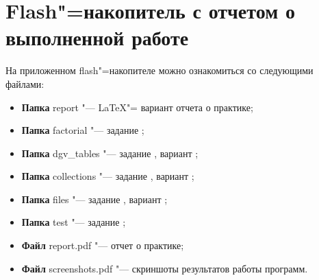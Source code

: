\section{Flash"=накопитель с отчетом о выполненной работе} \label{app:repo}
На приложенном flash"=накопителе можно ознакомиться со следующими файлами:
\begin{itemize}
    \item[] \textbf{Папка} report "--- \LaTeX "= вариант отчета о практике;
    \item[] \textbf{Папка} factorial "--- задание ;
    \item[] \textbf{Папка} dgv\_tables "--- задание , вариант ;
    \item[] \textbf{Папка} collections "--- задание , вариант ;
    \item[] \textbf{Папка} files "--- задание , вариант ;
    \item[] \textbf{Папка} test "--- задание ;
    \item[] \textbf{Файл} report.pdf "--- отчет о практике;
    \item[] \textbf{Файл} screenshots.pdf "--- скриншоты результатов работы программ.
\end{itemize}